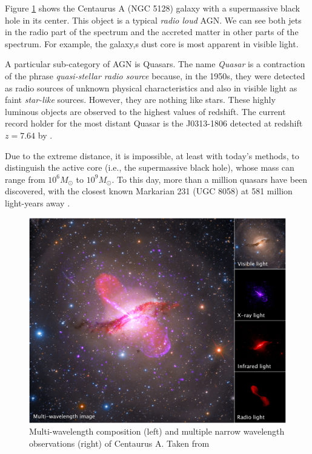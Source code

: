     Figure \ref{fig:centaurus_a_multiwave} shows the Centaurus A (NGC 5128) galaxy with a supermassive black hole in its center. This object is a typical \emph{radio loud} AGN. We can see both jets in the radio part of the spectrum and the accreted matter in other parts of the spectrum. For example, the galaxy,s dust core is most apparent in visible light.

    A particular sub-category of AGN is Quasars. The name \emph{Quasar} is a contraction of the phrase \emph{quasi-stellar radio source} because, in the 1950s, they were detected as radio sources of unknown physical characteristics and also in visible light as faint \emph{star-like} sources. However, they are nothing like stars. These highly luminous objects are observed to the highest values of redshift. The current record holder for the most distant Quasar is the J0313-1806 detected at redshift $z = 7.64$ by \cite{wang2021}. 

    Due to the extreme distance, it is impossible, at least with today's methods, to distinguish the active core (i.e., the supermassive black hole), whose mass can range from $10^6 M_{\odot}$ to $10^{9} M_{\odot}$. To this day, more than a million quasars have been discovered, with the closest known Markarian 231 (UGC 8058) at 581 million light-years away \cite{gaia2018}. 

    \begin{figure}
        \centering
        \includegraphics[width=\columnwidth]{img/multiwave_centaurus_a_agn.png}
        \caption{Multi-wavelength composition (left) and multiple narrow wavelength observations (right) of Centaurus A. Taken from \cite{nasa_img_centaurus_a}}
        \label{fig:centaurus_a_multiwave}
    \end{figure}

